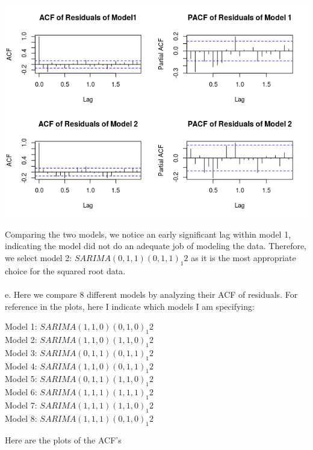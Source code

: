\documentclass[11pt]{article}
\begin{document}
\begin{center}
\includegraphics[scale=1]{1d}
\end{center}
Comparing the two models, we notice an early significant lag within model 1, indicating the model did not do an adequate job of modeling the data. Therefore, we select model 2: $SARIMA(0,1,1)(0,1,1)_1 2$ as it is the most appropriate choice for the squared root data.
\\\\
e. Here we compare 8 different models by analyzing their ACF of residuals. For reference in the plots, here I indicate which models I am specifying:
\begin{center}
Model 1: $SARIMA(1,1,0)(0,1,0)_1 2$ \\
Model 2: $SARIMA(1,1,0)(1,1,0)_1 2$ \\
Model 3: $SARIMA(0,1,1)(0,1,1)_1 2$ \\
Model 4: $SARIMA(1,1,0)(0,1,1)_1 2$ \\
Model 5: $SARIMA(0,1,1)(1,1,0)_1 2$ \\
Model 6: $SARIMA(1,1,1)(1,1,1)_1 2$ \\
Model 7: $SARIMA(1,1,1)(1,1,0)_1 2$ \\
Model 8: $SARIMA(1,1,1)(0,1,0)_1 2$
\end{center}
Here are the plots of the ACF's
\end{document}

